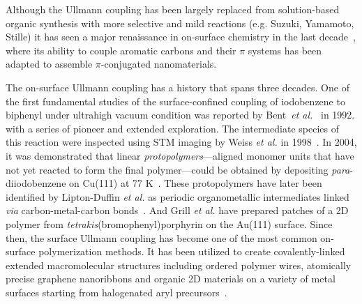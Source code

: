 \documentclass[journal=jacsat,manuscript=article]{achemso}
\begin{document}
{Although the Ullmann coupling has been largely replaced from solution-based organic synthesis with more selective and mild reactions (e.g. Suzuki, Yamamoto, Stille) it has seen a major renaissance in on-surface chemistry in the last decade~\cite{DIMA-refs}, where its ability to couple aromatic carbons and their $\pi$ systems has been adapted to assemble $\pi$-conjugated nanomaterials.

\ifdefined\INTERNAL

The on-surface Ullmann coupling has a history that spans three decades. One of the first fundamental studies of the surface-confined coupling of iodobenzene to biphenyl under ultrahigh vacuum condition was reported by Bent~\textit{et al.}~\cite{sur_sci01} in 1992. with a series of pioneer and extended exploration\cite{ullmann_127, ullmann_128, ullmann_129, ullmann_87}.
%
The intermediate species of this reaction were inspected using STM imaging by Weiss \textit{et al.} in 1998~\cite{langm01}. 
In 2004, it was demonstrated that linear \emph{protopolymers}---aligned monomer units that have not yet reacted to form the final polymer---could be obtained by depositing \textit{para}-diiodobenzene on Cu(111) at 77 K~\cite{jacs01}. 
%
These protopolymers have later been identified by Lipton-Duffin \textit{et al.} as periodic organometallic intermediates linked \textit{via} carbon-metal-carbon bonds~\cite{ullmann_88}.
And Grill \textit{et al.} have prepared patches of a 2D polymer from \textit{tetrakis}(bromophenyl)porphyrin on the Au(111) surface.
%
Since then, the surface Ullmann coupling has become one of the most common on-surface polymerization methods. It has been utilized to create covalently-linked extended macromolecular structures including ordered polymer wires, atomically precise graphene nanoribbons and organic 2D materials on a variety of metal surfaces starting from halogenated aryl precursors~\cite{ullmann_33,ullmann_34, ullmann_42, ullmann_43, ullmann_45, ullmann_46, ullmann_47, ullmann_48}. 

\fi

}
\end{document}
